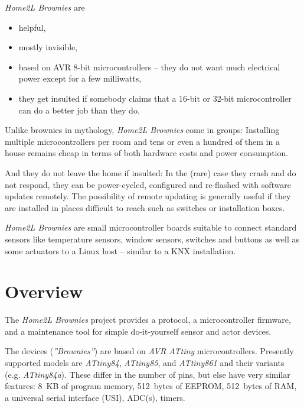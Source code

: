 \documentclass[12pt,english,parskip=half,headheight=19pt]{scrreprt}
\begin{document}
\textit{Home2L Brownies} are
\begin{itemize}
  \item helpful,
  \item mostly invisible,
  \item based on AVR 8-bit microcontrollers -- they do not want much electrical power except for a few milliwatts,
  \item they get insulted if somebody claims that a 16-bit or 32-bit microcontroller can do
        a better job than they do.
\end{itemize}
Unlike brownies in mythology, \textit{Home2L Brownies} come in groups:
Installing multiple microcontrollers per room and tens or even a hundred of them in a house remains cheap in terms of both hardware costs and power consumption.

And they do not leave the home if insulted: In the (rare) case they crash and do not respond, they can be power-cycled, configured and re-flashed with software updates remotely. The possibility of remote updating is generally useful if they are installed in places difficult to reach such as switches or installation boxes.

\textit{Home2L Brownies} are small microcontroller boards suitable to connect standard sensors like temperature sensors, window sensors, switches and buttons as well as some actuators to a Linux host -- similar to a KNX installation.





\section{Overview}
\label{sec:brownies-overview}


The \textit{Home2L Brownies} project provides a protocol, a microcontroller firmware, and a maintenance tool for simple do-it-yourself sensor and actor devices.

The devices (\textit{''Brownies''}) are based on \textit{AVR ATtiny} microcontrollers. Presently supported models are \textit{ATtiny84}, \textit{ATtiny85}, and \textit{ATtiny861} and their variants (e.g. \textit{ATtiny84a}). These differ in the number of pins, but else have very similar features: 8~KB of program memory, 512~bytes of EEPROM, 512~bytes of RAM, a universal serial interface (USI), ADC(s), timers.
\end{document}
